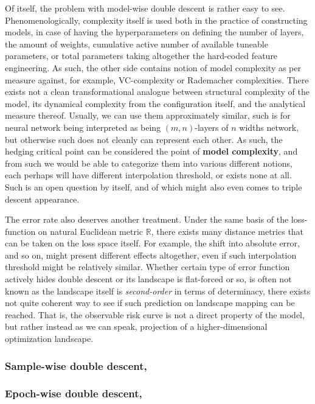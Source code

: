 Of itself, the problem with model-wise double descent is rather easy to see. Phenomenologically, complexity itself is used both in the practice of constructing models, in case of having the hyperparameters on defining the number of layers, the amount of weights, cumulative active number of available tuneable parameters, or total parameters taking altogether the hard-coded feature engineering. As such, the other side contains notion of model complexity as per measure against, for example, VC-complexity or Rademacher complexities. There exists not a clean transformational analogue between structural complexity of the model, its dynamical complexity from the configuration itself, and the analytical measure thereof. Usually, we can use them approximately similar, such is for neural network being interpreted as being $(m,n)$-layers of $n$ widths network, but otherwise such does not cleanly can represent each other. As such, the hedging critical point can be considered the point of \textbf{model complexity}, and from such we would be able to categorize them into various different notions, each perhaps will have different interpolation threshold, or exists none at all. Such is an open question by itself, and of which might also even comes to \cite{d_ascoli_triple_2020} triple descent appearance. 

The error rate also deserves another treatment. Under the same basis of the loss-function on natural Euclidean metric $\mathbb{R}$, there exists many distance metrics that can be taken on the loss space itself. For example, the shift into absolute error, and so on, might present different effects altogether, even if such interpolation threshold might be relatively similar. Whether certain type of error function actively hides double descent or its landscape is flat-forced or so, is often not known as the landscape itself is \textit{second-order} in terms of determinacy, there exists not quite coherent way to see if such prediction on landscape mapping can be reached. That is, the observable risk curve is not a direct property of the model, but rather instead as we can speak, projection of a higher-dimensional optimization landscape.

\subsubsection{Sample-wise double descent, \cite{hastie2019surprises,nakkiran2019datahurtlinearregression}}

\subsubsection{Epoch-wise double descent, \cite{nakkiran_deep_2019}}



